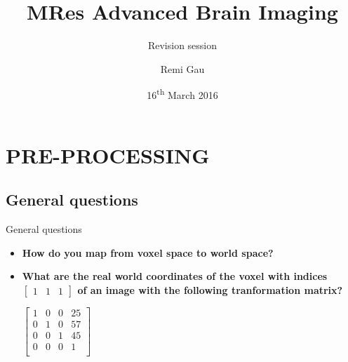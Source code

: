 \documentclass{beamer}
\title[MRes Advanced Brain Imaging]
{MRes Advanced Brain Imaging}
\subtitle[Revision session]
{Revision session}
\author[Remi Gau]
{Remi Gau}
\institute[University of Birmingham]
{
School of psychology\\
University of Birmingham
}
\date[Short Occasion]
{16\textsuperscript{th} March 2016}
\begin{document}
\footnotesize


\begin{frame}
  \titlepage
\end{frame}


\section{PRE-PROCESSING}


\subsection[General questions]{General questions}


\begin{frame}{General questions}
  \begin{itemize}
    \item \textbf{How do you map from voxel space to world space?}


    \item \textbf{What are the real world coordinates of the voxel with indices $\left[\begin{array}{ccc} 1&1&1\end{array}\right]$ of an image with the following tranformation matrix?}

    \begin{center}
      $
      \left[
      \begin{array}{cccc}
      1 & 0 & 0 & 25\\
      0 & 1 & 0 & 57\\
      0 & 0 & 1 & 45\\
      0 & 0 & 0 & 1\\
      \end{array}
      \right]
      $
    \end{center}

  \end{itemize}
\end{frame}
\end{document}
